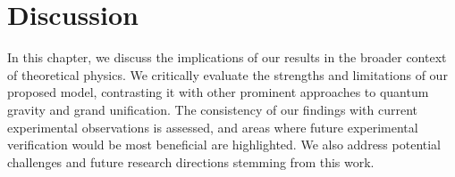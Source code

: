 \chapter{Discussion}
\label{chap:discussion}
In this chapter, we discuss the implications of our results in the broader context of theoretical physics. We critically evaluate the strengths and limitations of our proposed model, contrasting it with other prominent approaches to quantum gravity and grand unification. The consistency of our findings with current experimental observations is assessed, and areas where future experimental verification would be most beneficial are highlighted. We also address potential challenges and future research directions stemming from this work.
\blindtext[3] %
